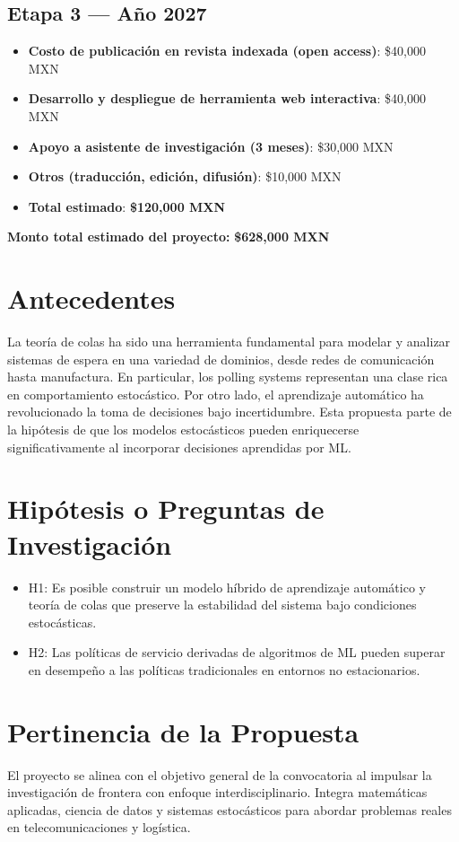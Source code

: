 \documentclass[12pt]{article}
\begin{document}
\subsection*{Etapa 3 — Año 2027}
\begin{itemize}
  \item \textbf{Costo de publicación en revista indexada (open access)}: \$40,000 MXN
  \item \textbf{Desarrollo y despliegue de herramienta web interactiva}: \$40,000 MXN
  \item \textbf{Apoyo a asistente de investigación (3 meses)}: \$30,000 MXN
  \item \textbf{Otros (traducción, edición, difusión)}: \$10,000 MXN
  \item \textbf{Total estimado}: \textbf{\$120,000 MXN}
\end{itemize}

\textbf{Monto total estimado del proyecto:} \textbf{\$628,000 MXN}



\section{Antecedentes}
La teoría de colas ha sido una herramienta fundamental para modelar y analizar sistemas de espera en una variedad de dominios, desde redes de comunicación hasta manufactura. En particular, los polling systems representan una clase rica en comportamiento estocástico. Por otro lado, el aprendizaje automático ha revolucionado la toma de decisiones bajo incertidumbre. Esta propuesta parte de la hipótesis de que los modelos estocásticos pueden enriquecerse significativamente al incorporar decisiones aprendidas por ML.

\section{Hipótesis o Preguntas de Investigación}
\begin{itemize}
  \item H1: Es posible construir un modelo híbrido de aprendizaje automático y teoría de colas que preserve la estabilidad del sistema bajo condiciones estocásticas.
  \item H2: Las políticas de servicio derivadas de algoritmos de ML pueden superar en desempeño a las políticas tradicionales en entornos no estacionarios.
\end{itemize}

\section{Pertinencia de la Propuesta}
El proyecto se alinea con el objetivo general de la convocatoria al impulsar la investigación de frontera con enfoque interdisciplinario. Integra matemáticas aplicadas, ciencia de datos y sistemas estocásticos para abordar problemas reales en telecomunicaciones y logística.
\end{document}

